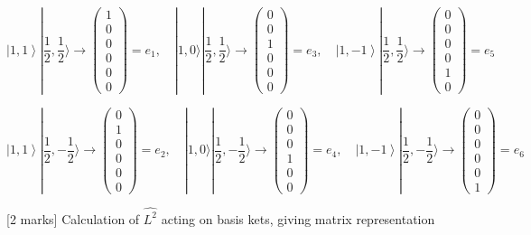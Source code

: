 \[
 \left|1, 1 \right> |\frac{1}{2},\frac{1}{2} \rangle \rightarrow \begin{pmatrix} 1\\ 0\\ 0\\ 0\\ 0\\ 0 \end{pmatrix} = e_1, \quad |1, 0 \rangle |\frac{1}{2}, \frac{1}{2} \rangle \rightarrow \begin{pmatrix} 0\\ 0\\ 1\\ 0\\ 0\\ 0 \end{pmatrix} = e_3, \quad \left|1, -1 \right>|\frac{1}{2}, \frac{1}{2} \rangle \rightarrow \begin{pmatrix} 0\\ 0\\ 0\\ 0\\ 1\\ 0 \end{pmatrix} = e_5
\]

\[
 \left|1, 1 \right> |\frac{1}{2},-\frac{1}{2} \rangle \rightarrow \begin{pmatrix} 0\\ 1\\ 0\\ 0\\ 0\\ 0 \end{pmatrix} = e_2, \quad |1, 0 \rangle |\frac{1}{2}, -\frac{1}{2} \rangle \rightarrow \begin{pmatrix} 0\\ 0\\ 0\\ 1\\ 0\\ 0 \end{pmatrix} = e_4, \quad \left|1, -1 \right>|\frac{1}{2}, -\frac{1}{2} \rangle \rightarrow \begin{pmatrix} 0\\ 0\\ 0\\ 0\\ 0\\ 1 \end{pmatrix} = e_6
\]

[2 marks] Calculation of  \( \hat{L^{2}} \) acting on basis kets, giving matrix representation 

